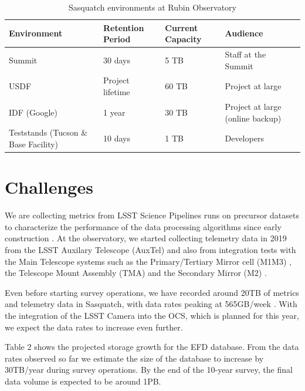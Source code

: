 \begin{table}[ht]
    \centering
    \caption{Sasquatch environments at Rubin Observatory}
    \begin{tabular}{@{}llll@{}}
        \toprule
        \textbf{Environment} & \textbf{Retention Period} & \textbf{Current Capacity} & \textbf{Audience} \\
        \midrule
        Summit & 30 days & 5 TB & Staff at the Summit \\
        USDF & Project lifetime & 60 TB & Project at large \\
        IDF (Google) & 1 year & 30 TB & Project at large (online backup) \\
        Teststands (Tucson \& Base Facility) & 10 days & 1 TB & Developers \\
        \bottomrule
    \end{tabular}
\end{table}

\section{Challenges}

We are collecting metrics from LSST Science Pipelines runs on precursor datasets to characterize the performance of the data processing algorithms since early construction \cite{DMTN-091,DMTN-211}. At the observatory, we started collecting telemetry data in 2019 from the LSST Auxilary Telescope (AuxTel) and also from integration tests with the Main Telescope systems such as the Primary/Tertiary Mirror cell (M1M3) \cite{SITCOMTN-088}, the Telescope Mount Assembly (TMA) \cite{SITCOMTN-121} and the Secondary Mirror (M2) \cite{SITCOMTN-120}.

Even before starting survey operations, we have recorded around 20TB of metrics and telemetry data in Sasquatch, with data rates peaking at 565GB/week \cite{SQR-085}. With the integration of the LSST Camera into the OCS, which is planned for this year, we expect the data rates to increase even further.

Table 2 shows the projected storage growth for the EFD database. From the data rates observed so far we estimate the size of the database to increase by 30TB/year during survey operations. By the end of the 10-year survey, the final data volume is expected to be around 1PB.

